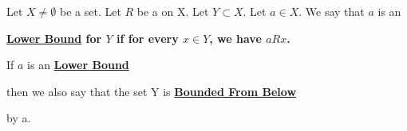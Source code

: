\label{def:LowerBound}
\newcommand{\LowerBound}[0]{
    \bf \hyperref[def:LowerBound]{Lower Bound} \rm
}

\newcommand{\BoundedFromBelow}[0]{
    \bf \hyperref[def:LowerBound]{Bounded From Below} \rm
}

\begin{df}
    Let $X \neq \emptyset$ be a set. 
    Let $R$ be a \Relation on X. 
    Let $Y \subset X$.
    Let $a \in X$. 
    We say that $a$ is an 
    \LowerBound for $Y$ if
    for every $x \in Y$, 
    we have $a R x$. 
    
    If $a$ is an \LowerBound
    then we also say that 
    the set Y is \BoundedFromBelow
    by a. 
\end{df}
